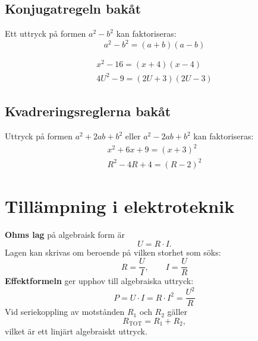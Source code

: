 \subsection{Konjugatregeln bakåt}
\label{c2:sec:konjbakat}
Ett uttryck på formen $a^2 - b^2$ kan faktoriseras:
\[
  a^2 - b^2 = (a + b)(a - b)
\]

\begin{exempel}
\begin{gather*}
  x^2 - 16 = (x + 4)(x - 4) \\
  4U^2 - 9 = (2U + 3)(2U - 3)
\end{gather*}
\end{exempel}

\subsection{Kvadreringsreglerna bakåt}
\label{c2:sec:kvbakat}
Uttryck på formen $a^2 + 2ab + b^2$ eller $a^2 - 2ab + b^2$ kan faktoriseras:
\begin{gather*}
  x^2 + 6x + 9 = (x + 3)^2 \\
  R^2 - 4R + 4 = (R - 2)^2
\end{gather*}

\section{Tillämpning i elektroteknik}
\label{c2:sec:tillampning}
\textbf{Ohms lag} på algebraisk form är
\[
  U = R \cdot I.
\]
Lagen kan skrivas om beroende på vilken storhet som söks:
\[
  R = \frac{U}{I}, \qquad I = \frac{U}{R}
\]
\textbf{Effektformeln} ger upphov till algebraiska uttryck:
\[
  P = U \cdot I = R \cdot I^2 = \frac{U^2}{R}
\]
Vid seriekoppling av motstånden $R_1$ och $R_2$ gäller
\[
  R_{\text{TOT}} = R_1 + R_2,
\]
vilket är ett linjärt algebraiskt uttryck.
